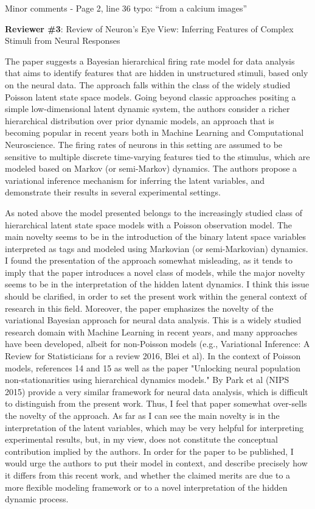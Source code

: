 \documentclass[12pt,a4paper]{article}
\begin{document}
Minor comments
- Page 2, line 36 typo: “from a calcium images”

{\bf Reviewer \#3}: Review of Neuron's Eye View: Inferring Features of Complex Stimuli from Neural Responses

The paper suggests a Bayesian hierarchical firing rate model for data analysis that aims to identify features that are hidden in unstructured stimuli, based only on the neural data. The approach falls within the class of the widely studied Poisson latent state space models. Going beyond classic approaches positing a simple low-dimensional latent dynamic system, the authors consider a richer hierarchical distribution over prior dynamic models, an approach that is becoming popular in recent years both in Machine Learning and Computational Neuroscience. The firing rates of neurons in this setting are assumed to be sensitive to multiple discrete time-varying features tied to the stimulus, which are modeled based on Markov (or semi-Markov) dynamics. The authors propose a variational inference mechanism for inferring the latent variables, and demonstrate their results in several experimental settings.

As noted above the model presented belongs to the increasingly studied class of hierarchical latent state space models with a Poisson observation model. The main novelty seems to be in the introduction of the binary latent space variables interpreted as tags and modeled using Markovian (or semi-Markovian) dynamics. I found the presentation of the approach somewhat misleading, as it tends to imply that the paper introduces a novel class of models, while the major novelty seems to be in the interpretation of the hidden latent dynamics. I think this issue should be clarified, in order to set the present work within the general context of research in this field. Moreover, the paper emphasizes the novelty of the variational Bayesian approach for neural data analysis. This is a widely studied research domain with Machine Learning in recent years, and many approaches have been developed, albeit for non-Poisson models (e.g., Variational Inference: A Review for Statisticians for a review 2016, Blei et al). In the context of Poisson models, references 14 and 15 as well as the paper "Unlocking neural population non-stationarities using hierarchical dynamics models." By Park et al (NIPS 2015) provide a very similar framework for neural data analysis, which is difficult to distinguish from the present work. Thus, I feel that paper somewhat over-sells the novelty of the approach. As far as I can see the main novelty is in the interpretation of the latent variables, which may be very helpful for interpreting experimental results, but, in my view, does not constitute the conceptual contribution implied by the authors. In order for the paper to be published, I would urge the authors to put their model in context, and describe precisely how it differs from this recent work, and whether the claimed merits are due to a more flexible modeling framework or to a novel interpretation of the hidden dynamic process.
\end{document}
